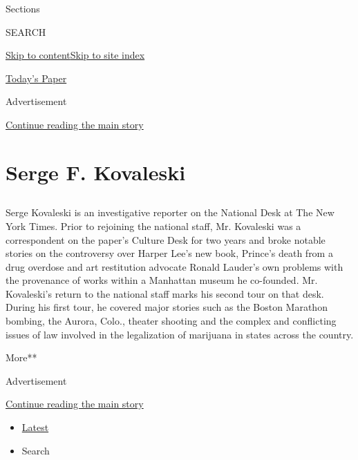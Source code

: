 Sections

SEARCH

\protect\hyperlink{site-content}{Skip to
content}\protect\hyperlink{site-index}{Skip to site index}

\href{https://myaccount.nytimes3xbfgragh.onion/auth/login?response_type=cookie\&client_id=vi}{}

\href{https://www.nytimes3xbfgragh.onion/section/todayspaper}{Today's
Paper}

Advertisement

\protect\hyperlink{after-top}{Continue reading the main story}

\hypertarget{serge-f-kovaleski}{%
\section{Serge F. Kovaleski}\label{serge-f-kovaleski}}

\subsection{}

Serge Kovaleski is an investigative reporter on the National Desk at The
New York Times. Prior to rejoining the national staff, Mr. Kovaleski was
a correspondent on the paper's Culture Desk for two years and broke
notable stories on the controversy over Harper Lee's new book, Prince's
death from a drug overdose and art restitution advocate Ronald Lauder's
own problems with the provenance of works within a Manhattan museum he
co-founded. Mr. Kovaleski's return to the national staff marks his
second tour on that desk. During his first tour, he covered major
stories such as the Boston Marathon bombing, the Aurora, Colo., theater
shooting and the complex and conflicting issues of law involved in the
legalization of marijuana in states across the country.

More**

Advertisement

\protect\hyperlink{after-mid1}{Continue reading the main story}

\begin{itemize}
\tightlist
\item
  \protect\hyperlink{stream-panel}{Latest}
\item
  Search
\end{itemize}


